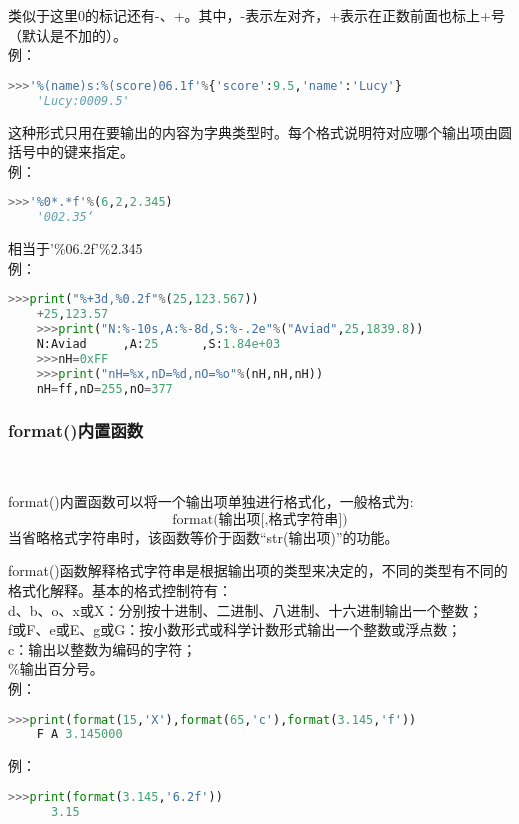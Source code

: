 \documentclass[11pt,a4paper]{article}
\begin{document}
类似于这里0的标记还有-、+。其中，-表示左对齐，+表示在正数前面也标上+号（默认是不加的）。\\
例：
\begin{lstlisting}[language={Python}]
    >>>'%(name)s:%(score)06.1f'%{'score':9.5,'name':'Lucy'}
    'Lucy:0009.5'
\end{lstlisting}
这种形式只用在要输出的内容为字典类型时。每个格式说明符对应哪个输出项由圆括号中的键来指定。\\
例：
\newpage
\begin{lstlisting}[language={Python}]
    >>>'%0*.*f'%(6,2,2.345)
    '002.35‘
\end{lstlisting}
相当于'\%06.2f'\%2.345\\
例：
\begin{lstlisting}[language={Python}]
    >>>print("%+3d,%0.2f"%(25,123.567))
    +25,123.57
    >>>print("N:%-10s,A:%-8d,S:%-.2e"%("Aviad",25,1839.8))
    N:Aviad     ,A:25      ,S:1.84e+03
    >>>nH=0xFF
    >>>print("nH=%x,nD=%d,nO=%o"%(nH,nH,nH))
    nH=ff,nD=255,nO=377
\end{lstlisting}

\subsubsection{format()内置函数}~{}

format()内置函数可以将一个输出项单独进行格式化，一般格式为:
$$\mbox{format(输出项[,格式字符串])}$$
当省略格式字符串时，该函数等价于函数“str(输出项)”的功能。

format()函数解释格式字符串是根据输出项的类型来决定的，不同的类型有不同的格式化解释。基本的格式控制符有：\\
d、b、o、x或X：分别按十进制、二进制、八进制、十六进制输出一个整数；\\
f或F、e或E、g或G：按小数形式或科学计数形式输出一个整数或浮点数；\\
c：输出以整数为编码的字符；\\
\%输出百分号。\\
例：
\begin{lstlisting}[language={Python}]
    >>>print(format(15,'X'),format(65,'c'),format(3.145,'f'))
    F A 3.145000
\end{lstlisting}
例：
\begin{lstlisting}[language={Python}]
    >>>print(format(3.145,'6.2f'))
      3.15
\end{lstlisting}
\end{document}
